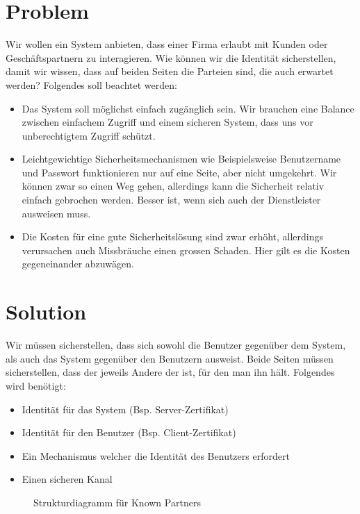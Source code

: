 \section{Problem}
Wir wollen ein System anbieten, dass einer Firma erlaubt mit Kunden oder Geschäftspartnern zu interagieren. Wie können wir die Identität sicherstellen, damit wir wissen, dass auf beiden Seiten die Parteien sind, die auch erwartet werden? Folgendes soll beachtet werden:
\begin{itemize}
  \item Das System soll möglichst einfach zugänglich sein. Wir brauchen eine Balance zwischen einfachem Zugriff und einem sicheren System, dass uns vor unberechtigtem Zugriff schützt.
  \item Leichtgewichtige Sicherheitsmechanismen wie Beispielsweise Benutzername und Passwort funktionieren nur auf eine Seite, aber nicht umgekehrt. Wir können zwar so einen Weg gehen, allerdings kann die Sicherheit relativ einfach gebrochen werden. Besser ist, wenn sich auch der Dienstleister ausweisen muss.
  \item Die Kosten für eine gute Sicherheitslösung sind zwar erhöht, allerdings verursachen auch Missbräuche einen grossen Schaden. Hier gilt es die Kosten gegeneinander abzuwägen.
\end{itemize}

\section{Solution}
Wir müssen sicherstellen, dass sich sowohl die Benutzer gegenüber dem System, als auch das System gegenüber den Benutzern ausweist. Beide Seiten müssen sicherstellen, dass der jeweils Andere der ist, für den man ihn hält. Folgendes wird benötigt:

\begin{itemize}
  \item Identität für das System (Bsp. Server-Zertifikat)
  \item Identität für den Benutzer (Bsp. Client-Zertifikat)
  \item Ein Mechanismus welcher die Identität des Benutzers erfordert
  \item Einen sicheren Kanal
\end{itemize}

\begin{figure}[H]
  \centering
  
  \caption{Strukturdiagramm f\"ur Known Partners}
\end{figure}

